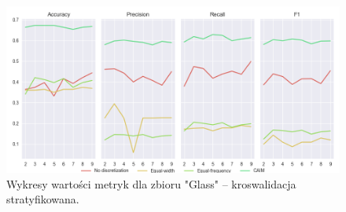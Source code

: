 
\begin{figure}[H]
\center
    \includegraphics[width=\textwidth]{img/cv_scores_stratifiedkfold/scoring_stratifiedkfold_glass.png}
    \caption{Wykresy wartości metryk dla zbioru "Glass" -- kroswalidacja stratyfikowana.}
\end{figure}

